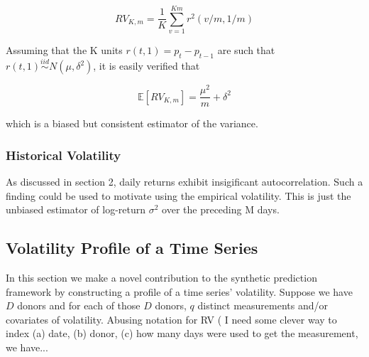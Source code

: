 \documentclass[11pt]{article}
\newcommand{\simiid}{\stackrel{iid}{\sim}} %
\def\E{\mathbb{E}} %
\theoremstyle{definition}
\begin{document}
$$RV_{K,m} = \frac{1}{K}\sum^{Km}_{v=1}r^{2}(v/m,1/m)$$

Assuming that the K units $r(t, 1) = p_{t} - p_{t-1}$ are such that $r(t, 1) \simiid N(\mu, \delta^{2})$, it is easily verified that 

$$\E[RV_{K,m}] = \frac{\mu^{2}}{m} + \delta^{2}$$

which is a biased but consistent estimator of the variance.

\subsubsection{Historical Volatility}

As discussed in section 2, daily returns exhibit insigificant autocorrelation.  Such a finding could be used to motivate using the empirical volatility.  This is just the unbiased estimator of log-return $\sigma^{2}$ over the preceding M days.

\subsection{Volatility Profile of a Time Series}
\label{Volatility Profile of a Time Series}

In this section we make a novel contribution to the synthetic prediction framework by constructing a profile of a time series' volatility.  Suppose we have $D$ donors and for each of those $D$ donors, $q$ distinct measurements and/or covariates of volatility.  Abusing notation for RV ( I need some clever way to index (a) date, (b) donor, (c) how many days were used to get the measurement, we have...
\end{document}
